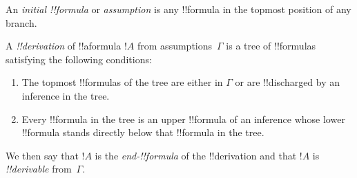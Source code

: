 \documentclass[../../../include/open-logic-section]{subfiles}
\begin{document}
\begin{defn}
An \emph{initial !!{formula}} or \emph{assumption} is any !!{formula}
in the topmost position of any branch.
\end{defn}

\begin{defn}[!!^{derivation}]
A \emph{!!{derivation}} of !!a{formula} $!A$ from assumptions~$\Gamma$
is a tree of !!{formula}s satisfying the following conditions:
\begin{enumerate}
\item The topmost !!{formula}s of the tree are either in $\Gamma$ or
  are !!{discharged} by an inference in the tree.
\item Every !!{formula} in the tree is an upper !!{formula} of an
  inference whose lower !!{formula} stands directly below that !!{formula} in
  the tree.
\end{enumerate}
We then say that $!A$ is the \emph{end-!!{formula}} of the
!!{derivation} and that $!A$ is \emph{!!{derivable}} from~$\Gamma$.
\end{defn}
\end{document}
